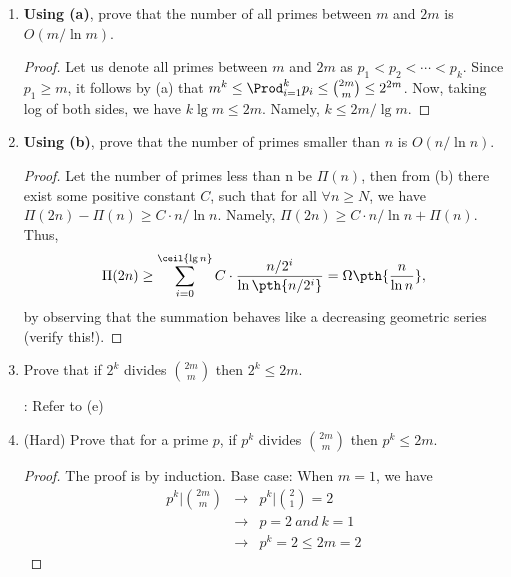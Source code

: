 \documentclass[11pt]{article}
\begin{document}
\begin{enumerate}
\begin{enumerate}
        \item {} \textbf{Using (a)}, prove that the
        number of all primes between $m$ and $2m$ is
        $O(m/\ln m)$.
        \begin{proof}
            Let us denote all primes between $m$ and $2m$ as
            $p_1 < p_2 < \cdots< p_k$.  Since $p_1 \geq m$,
            it follows by (a) that $m^k \le \Prod_{i=1}^{k}
            {p_i} \le {2m\choose{m}}\leq 2^{2m}$.
            Now, taking log of both sides, we have
            $k \lg{m} \leq 2m$. Namely, $k \leq 2m/\lg m$.
        \end{proof}

        \item {} \textbf{Using (b)}, prove that the
        number of primes smaller than $n$ is $O(n/\ln n)$.
        \begin{proof}
            Let the number of primes less than n be
            $\Pi(n)$, then from (b) there exist some
            positive constant $C$, such that for all
            $\forall n \ge N$, we have $\Pi(2n) - \Pi(n) \ge
            C\cdot n/\ln{n}$. Namely, $\Pi(2n) \geq C\cdot
            n/\ln{n}+ \Pi(n)$. Thus,
            \[
            \Pi(2n) \geq \sum_{i=0}^{\ceil{\lg n} } C\cdot
            \frac{n/2^i}{\ln \pth{n/2^i}} = \Omega\pth{\frac{n}{\ln{n}}},
            \]
            by observing that the summation behaves like a
            decreasing geometric series (verify this!).
        \end{proof}
        
        \item {} Prove that if $2^k$ divides
        $\binom{2m}{m}$ then $2^k \leq 2m$.

        :
            Refer to (e)

        \item {} (Hard) Prove that for a prime $p$, if $p^k$
        divides $\binom{2m}{m}$ then $p^k \leq 2m$.
        
        \begin{proof}
            The proof is by induction.  Base case: When $m =
            1$, we have
            \begin{eqnarray*}
                p^k | {2m\choose{m}} &\rightarrow& p^k | {2\choose{1}} = 2\\
                &\rightarrow& p = 2 \ and\ k = 1\\
                &\rightarrow& p^k = 2 \le 2m = 2
            \end{eqnarray*}
            

\end{proof}
\end{enumerate}
\end{enumerate}
\end{document}
